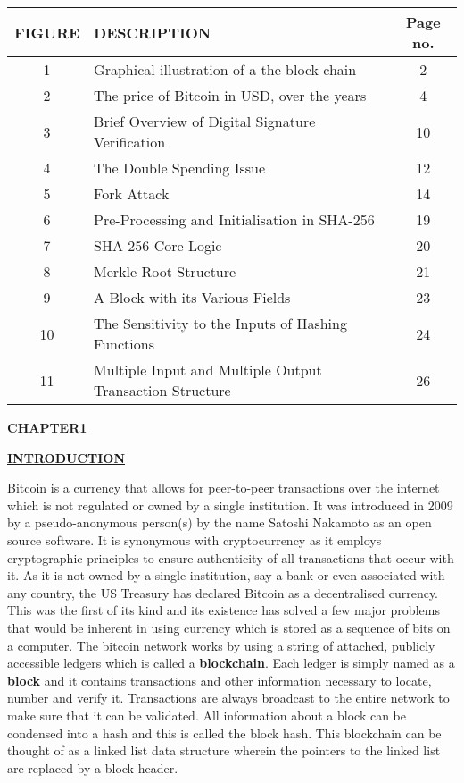 \documentclass[12pt,a4paper]{report}
\newcommand{\blank}[1]{\hspace*{#1}}
\begin{document}
\begin{flushleft}
\begin{tabular}{|c |l| c|}\hline
\textbf{FIGURE} &  DESCRIPTION\blank{7cm} & \textbf{Page no.}\\ \hline
1 &  Graphical illustration of a the block chain  & 2 \\ \hline
2 & The price of Bitcoin in USD, over the years & 4\\ \hline
3 &  Brief Overview of Digital Signature Verification   & 10\\ \hline
4 &  The Double Spending Issue & 12\\ \hline
5 &  Fork Attack  & 14\\ \hline
6 &  Pre-Processing and Initialisation in SHA-256    & 19\\ \hline
7 &  SHA-256 Core Logic        &20\\ \hline
8 &   Merkle Root Structure    &21\\ \hline
9 &  A Block with its Various Fields   & 23\\ \hline
10 &  The Sensitivity to the Inputs of Hashing Functions  & 24\\ \hline
11 &  Multiple Input and Multiple Output Transaction Structure  & 26\\ \hline
\end{tabular}
\newpage
{}
\setcounter{page}{1}

\begin{center}\underline{  \Large\textbf{CHAPTER1}}\end{center}
\begin{center}\underline{ \Large \textbf{INTRODUCTION}}\end{center}
\vspace{10mm} 
Bitcoin is a currency that allows for peer-to-peer transactions over the internet which is not regulated or owned by a single institution. It was introduced in 2009 by a pseudo-anonymous person(s) by the name Satoshi Nakamoto as an open source software.
\vspace{10mm}
It is synonymous with cryptocurrency as it employs cryptographic principles to ensure authenticity of all transactions that occur with it. As it is not owned by a single institution, say a bank or even associated with any country, the US Treasury has declared Bitcoin as a decentralised currency. This was the first of its kind and its existence has solved a few major problems that would be inherent in using currency which is stored as a sequence of bits on a computer.
The bitcoin network works by using a string of attached, publicly accessible ledgers which is called a \textbf{blockchain}. Each ledger is simply named as a \textbf{block} and it contains transactions and other information necessary to locate, number and verify it. Transactions are always broadcast to the entire network to make sure that it can be validated. All information about a block can be condensed into a hash and this is called the block hash. This blockchain can be thought of as a linked list data structure wherein the pointers to the linked list are replaced by a block header.


\end{flushleft}
\end{document}
